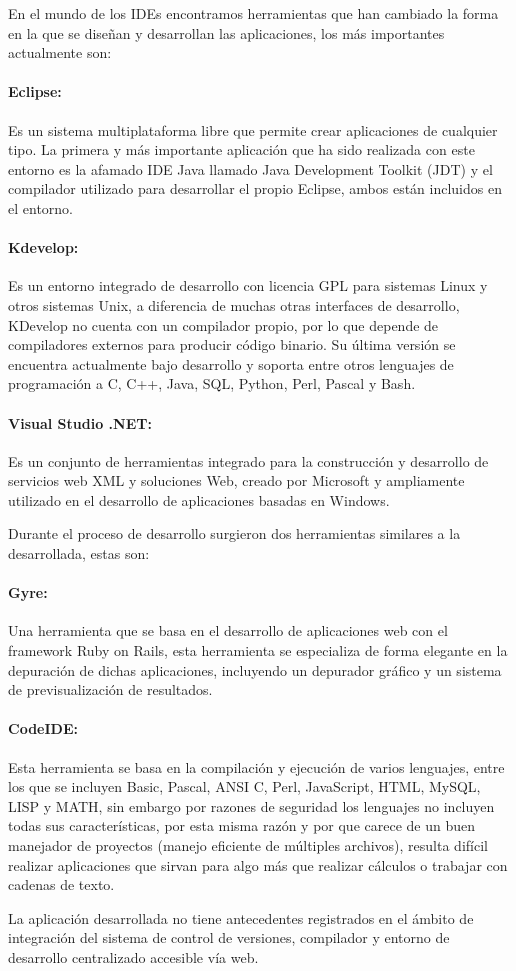 En el mundo de los IDEs encontramos herramientas que han cambiado la forma en la que se diseñan y desarrollan las aplicaciones, los más importantes actualmente son:


\paragraph{Eclipse: \cite{eclipse}} Es un sistema multiplataforma libre que permite crear aplicaciones de cualquier tipo. La primera y más importante aplicación que ha sido realizada con este entorno es la afamado IDE Java llamado Java Development Toolkit (JDT) y el compilador utilizado para desarrollar el propio Eclipse, ambos están incluidos en el entorno.

\paragraph{Kdevelop: \cite{kdevelop}} Es un entorno integrado de desarrollo con licencia GPL para sistemas Linux y otros sistemas Unix, a diferencia de muchas otras interfaces de desarrollo, KDevelop no cuenta con un compilador propio, por lo que depende de compiladores externos para producir código binario. Su última versión se encuentra actualmente bajo desarrollo y soporta entre otros lenguajes de programación a C, C++, Java, SQL, Python, Perl, Pascal y Bash.

\paragraph{Visual Studio .NET: \cite{visual_studio}} Es un conjunto de herramientas integrado para la construcción y desarrollo de servicios web XML y soluciones Web, creado por Microsoft y ampliamente utilizado en el desarrollo de aplicaciones basadas en Windows.


Durante el proceso de desarrollo surgieron dos herramientas similares a la desarrollada, estas son:


\paragraph{Gyre:\cite{gyre}} Una herramienta que se basa en el desarrollo de aplicaciones web con el framework Ruby on Rails, esta herramienta se especializa de forma elegante en la depuración de dichas aplicaciones, incluyendo un depurador gráfico y un sistema de previsualización de resultados.

\paragraph{CodeIDE:\cite{codeide}} Esta herramienta se basa en la compilación y ejecución de varios lenguajes, entre los que se incluyen Basic, Pascal, ANSI C, Perl, JavaScript, HTML, MySQL, LISP y MATH, sin embargo por razones de seguridad los lenguajes no incluyen todas sus características, por esta misma razón y por que carece de un buen manejador de proyectos (manejo eficiente de múltiples archivos), resulta difícil realizar aplicaciones que sirvan para algo más que realizar cálculos o trabajar con cadenas de texto.


La aplicación desarrollada no tiene antecedentes registrados en el ámbito de integración del sistema de control de versiones, compilador y entorno de desarrollo centralizado accesible vía web.


